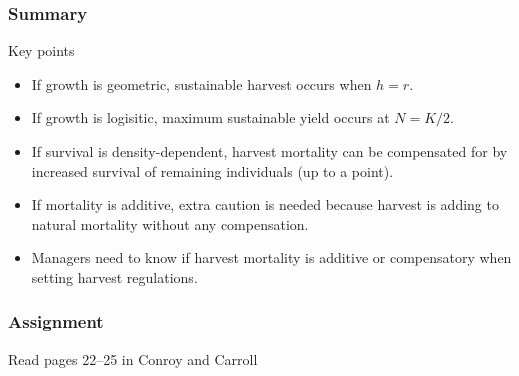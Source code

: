 \documentclass[color=usenames,dvipsnames]{beamer}\usepackage[]{graphicx}\usepackage[]{xcolor}
\begin{document}
\begin{frame}
  \frametitle{Summary}
  {Key points}
  \begin{itemize}
    \item If growth is geometric, sustainable harvest occurs when $h=r$.
    \item If growth is logisitic, maximum sustainable yield occurs at $N=K/2$.
    \item If survival is density-dependent, harvest mortality can be
      compensated for by increased survival of remaining individuals
      (up to a point).
    \item If mortality is additive, extra caution is needed
      because harvest is adding to natural mortality without any
      compensation.
    \item Managers need to know if harvest mortality is additive or
      compensatory when setting harvest regulations.
  \end{itemize}
\end{frame}



\begin{frame}
  \frametitle{Assignment}
  \LARGE \centering
  Read pages 22--25 in Conroy and Carroll
\end{frame}




\end{document}
